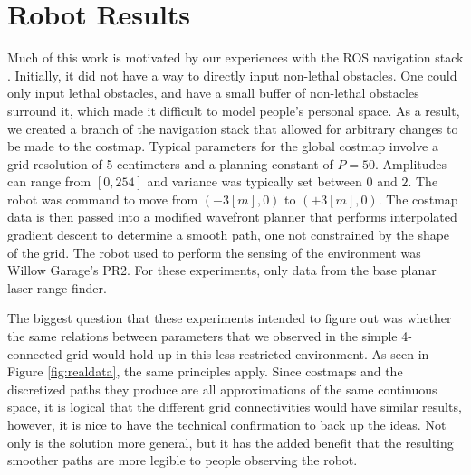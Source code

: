 \section{Robot Results}
Much of this work is motivated by our experiences with the ROS navigation stack \cite{marder:office}. Initially, it did not have a way to directly input non-lethal obstacles. One could only input lethal obstacles, and have a small buffer of non-lethal obstacles surround it, which made it difficult to model people's personal space. As a result, we created a branch of the navigation stack that allowed for arbitrary changes to be made to the costmap. Typical parameters for the global costmap involve a grid resolution of 5 centimeters and a planning constant of $P=50$. Amplitudes can range from $[0, 254]$ and variance was typically set between $0$ and $2$. The robot was command to move from $(-3[m], 0)$ to $(+3[m], 0)$. The costmap data is then passed into a modified wavefront planner that performs interpolated gradient descent to determine a smooth path, one not constrained by the shape of the grid. The robot used to perform the sensing of the environment was Willow Garage's PR2. For these experiments, only data from the base planar laser range finder. 

The biggest question that these experiments intended to figure out was whether the same relations between parameters that we observed in the simple 4-connected grid would hold up in this less restricted environment. As seen in Figure \ref{fig:realdata}, the same principles apply. Since costmaps and the discretized paths they produce are all approximations of the same continuous space, it is logical that the different grid connectivities would have similar results, however, it is nice to have the technical confirmation to back up the ideas. Not only is the solution more general, but it has the added benefit that the resulting smoother paths are more legible to people observing the robot. 


